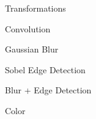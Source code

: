 \documentclass{beamer}
\begin{document}
\begin{frame}{Transformations}

\end{frame}

\begin{frame}{Convolution}
\end{frame}

\begin{frame}{Gaussian Blur}

\end{frame}

\begin{frame}{Sobel Edge Detection}

\end {frame}

\begin{frame}{Blur + Edge Detection}

\end{frame}


\begin{frame}{Color}

\end{frame}
\end{document}

